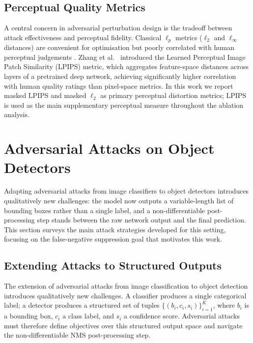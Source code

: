 \documentclass[12pt,a4paper]{report}
\begin{document}
\subsection{Perceptual Quality Metrics}

A central concern in adversarial perturbation design is the tradeoff between
attack effectiveness and perceptual fidelity. Classical $\ell_p$ metrics
($\ell_2$ and $\ell_\infty$ distances) are convenient for optimisation but
poorly correlated with human perceptual judgements \cite{zhang2018unreasonable}.
Zhang et al.\ \cite{zhang2018unreasonable} introduced the Learned Perceptual Image
Patch Similarity (LPIPS) metric, which aggregates feature-space distances
across layers of a pretrained deep network, achieving significantly higher
correlation with human quality ratings than pixel-space metrics. In this work
we report masked LPIPS and masked $\ell_2$ as primary perceptual distortion metrics;
LPIPS is used as the main supplementary perceptual measure throughout the ablation analysis.

\section{Adversarial Attacks on Object Detectors}
\label{sec:detector_attacks}

Adapting adversarial attacks from image classifiers to object detectors
introduces qualitatively new challenges: the model now outputs a
variable-length list of bounding boxes rather than a single label, and
a non-differentiable post-processing step stands between the raw network
output and the final prediction. This section surveys the main attack
strategies developed for this setting, focusing on the false-negative
suppression goal that motivates this work.

\subsection{Extending Attacks to Structured Outputs}

The extension of adversarial attacks from image classification to object
detection introduces qualitatively new challenges. A classifier produces a
single categorical label; a detector produces a structured set of tuples
$\{(b_i, c_i, s_i)\}_{i=1}^{K}$, where $b_i$ is a bounding box, $c_i$ a
class label, and $s_i$ a confidence score. Adversarial attacks must therefore
define objectives over this structured output space and navigate the
non-differentiable NMS post-processing step.
\end{document}
